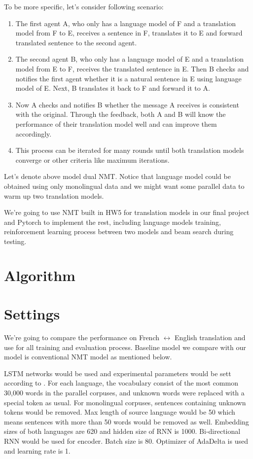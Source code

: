 \documentclass[11pt]{article}
\begin{document}
{To be more specific, let's consider following scenario:
\begin{enumerate}[label*=\arabic*.]
\item The first agent A, who only has a language model of F and a translation model from F to E, receives a sentence in F, translates it to E and forward translated sentence to the second agent.

\item The second agent B, who only has a language model of E and a translation model from E to F, receives the translated sentence in E. Then B checks and notifies the first agent whether it is a natural sentence in E using language model of E. Next, B translates it back to F and forward it to A.

\item Now A checks and notifies B whether the message A receives is consistent with the original. Through the feedback, both A and B will know the performance of their translation model well and can improve them accordingly.

\item This process can be iterated for many rounds until both translation models converge or other criteria like maximum iterations.
\end{enumerate}
Let's denote above model dual NMT. Notice that language model could be obtained using only monolingual data and we might want some parallel data to warm up two translation models.

We're going to use NMT built in HW5 for translation models in our final project and Pytorch to implement the rest, including language models training,  reinforcement learning process between two models and beam search during testing.
\part{Algorithm}


\part{Settings}
We're going to compare the performance on French $\leftrightarrow$ English translation and use \href{https://github.com/OpenNMT/OpenNMT-py}{\color{blue}{OpenNMT in PyTorch }} for all training and evaluation process. Baseline model we compare with our model is conventional NMT model as mentioned below.

LSTM networks would be used and experimental parameters would be sett according to \cite{bahdanau2014neural}. For each language, the vocabulary consist of the most common 30,000 words in the parallel corpuses, and unknown words were replaced with a special token as usual. For monolingual corpuses, sentences containing unknown tokens would be removed. Max length of source language would be 50 which means sentences with more than 50 words would be removed as well. Embedding sizes of both languages are 620 and hidden size of RNN is 1000. Bi-directional RNN would be used for encoder. Batch size is 80. Optimizer of AdaDelta is used and learning rate is 1.

}
\end{document}
